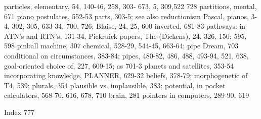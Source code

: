 particles, elementary, 54, 140-46, 258, 303-     673,
5, 309,522                                       728
partitions, mental, 671                          piano postulates, 552-53
parts, 303-5; see also reductionism Pascal,      pianos, 3-4, 302, 305, 633-34, 700, 726;
Blaise, 24, 25, 600                              inverted, 681-83
pathways: in ATN's and RTN's, 131-34,            Pickruick papers, The (Dickens), 24. 326,
150;                                             595, 598 pinball machine, 307
chemical, 528-29, 544-45, 663-64;                pipe Dream, 703
conditional on circumstances, 383-84;            pipes, 480-82, 486, 488, 493-94, 521, 638,
goal-oriented choice of, 227, 609-15; as         701-3 planets and satellites, 353-54
incorporating knowledge,                         PLANNER, 629-32
beliefs, 378-79; morphogenetic of T4, 539;       plurals, 354
plausible vs. implausible, 383; potential, in    pocket calculators, 568-70, 616, 678, 710
brain, 281                                       pointers in computers, 289-90, 619



Index                                                                                    777

